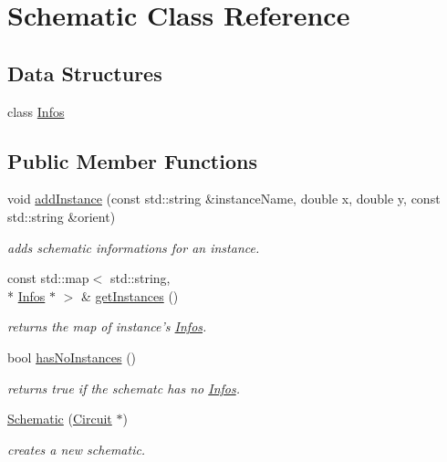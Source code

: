 \hypertarget{class_open_chams_1_1_schematic}{\section{Schematic Class Reference}
\label{class_open_chams_1_1_schematic}
}
\subsection*{Data Structures}
\begin{DoxyCompactItemize}
\item 
class \hyperlink{class_open_chams_1_1_schematic_1_1_infos}{Infos}
\end{DoxyCompactItemize}
\subsection*{Public Member Functions}
\begin{DoxyCompactItemize}
\item 
void \hyperlink{class_open_chams_1_1_schematic_ac7fc9f5cdf1e22c53d42e6606e1af8ef}{add\-Instance} (const std\-::string \&instance\-Name, double x, double y, const std\-::string \&orient)
\begin{DoxyCompactList}\small\item\em adds schematic informations for an instance. \end{DoxyCompactList}\item 
\hypertarget{class_open_chams_1_1_schematic_afa015b02922d82de9c44e8ffe8dc5d56}{const std\-::map$<$ std\-::string, \\*
\hyperlink{class_open_chams_1_1_schematic_1_1_infos}{Infos} $\ast$ $>$ \& \hyperlink{class_open_chams_1_1_schematic_afa015b02922d82de9c44e8ffe8dc5d56}{get\-Instances} ()}\label{class_open_chams_1_1_schematic_afa015b02922d82de9c44e8ffe8dc5d56}

\begin{DoxyCompactList}\small\item\em returns the map of instance's \hyperlink{class_open_chams_1_1_schematic_1_1_infos}{Infos}. \end{DoxyCompactList}\item 
\hypertarget{class_open_chams_1_1_schematic_adab62a25face462baec9a7fffb2b6158}{bool \hyperlink{class_open_chams_1_1_schematic_adab62a25face462baec9a7fffb2b6158}{has\-No\-Instances} ()}\label{class_open_chams_1_1_schematic_adab62a25face462baec9a7fffb2b6158}

\begin{DoxyCompactList}\small\item\em returns true if the schematc has no \hyperlink{class_open_chams_1_1_schematic_1_1_infos}{Infos}. \end{DoxyCompactList}\item 
\hyperlink{class_open_chams_1_1_schematic_a88d7382ee58bc8d509a8f9b05a57e8b3}{Schematic} (\hyperlink{class_open_chams_1_1_circuit}{Circuit} $\ast$)
\begin{DoxyCompactList}\small\item\em creates a new schematic. \end{DoxyCompactList}\end{DoxyCompactItemize}


